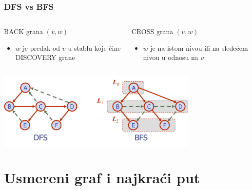 \documentclass[compress]{beamer}
\begin{document}
\begin{frame}[fragile]
  \frametitle{DFS vs BFS}
  \begin{columns}
    \begin{column}[t]{6cm}
      {\scriptsize BACK} grana $(v,w)$
      \begin{itemize}
        \item $w$ je predak od $v$ u stablu koje čine {\scriptsize 
          DISCOVERY} grane
      \end{itemize}
    \end{column}
    \begin{column}[t]{6cm}
      {\scriptsize CROSS} grana $(v,w)$
      \begin{itemize}
        \item $w$ je na istom nivou ili na sledećem nivou u odnosu na 
          $v$
      \end{itemize}
    \end{column}
  \end{columns}
  \begin{center}
    \includegraphics[width=10cm]{asp-14-pic26.png}
  \end{center}
\end{frame}

\section[Usmereni graf]{Usmereni graf i najkraći put}
\end{document}
